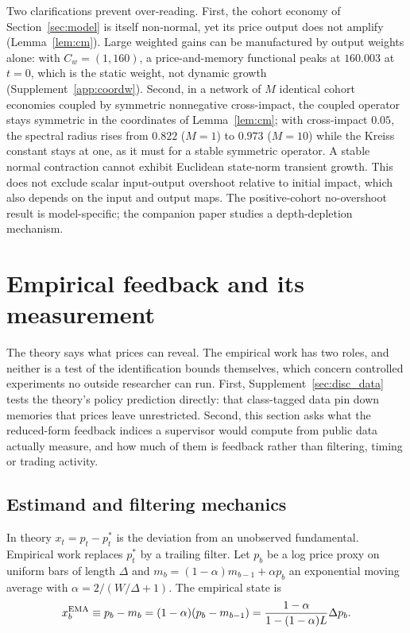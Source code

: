 \documentclass[12pt]{article}
\theoremstyle{definition}
\theoremstyle{remark}
\begin{document}
Two clarifications prevent over-reading. First, the cohort economy of Section~\ref{sec:model} is itself non-normal, yet its price output does not amplify (Lemma~\ref{lem:cm}). Large weighted gains can be manufactured by output weights alone: with $C_w=(1,160)$, a price-and-memory functional peaks at $160.003$ at $t=0$, which is the static weight, not dynamic growth (Supplement~\ref{app:coordw}). Second, in a network of $M$ identical cohort economies coupled by symmetric nonnegative cross-impact, the coupled operator stays symmetric in the coordinates of Lemma~\ref{lem:cm}; with cross-impact $0.05$, the spectral radius rises from $0.822$ ($M=1$) to $0.973$ ($M=10$) while the Kreiss constant stays at one, as it must for a stable symmetric operator. A stable normal contraction cannot exhibit Euclidean state-norm transient growth. This does not exclude scalar input-output overshoot relative to initial impact, which also depends on the input and output maps. The positive-cohort no-overshoot result is model-specific; the companion paper studies a depth-depletion mechanism.
\section{Empirical feedback and its measurement}\label{sec:empirics}

The theory says what prices can reveal. The empirical work has two roles, and neither is a test of the identification bounds themselves, which concern controlled experiments no outside researcher can run. First, Supplement~\ref{sec:disc_data} tests the theory's policy prediction directly: that class-tagged data pin down memories that prices leave unrestricted. Second, this section asks what the reduced-form feedback indices a supervisor would compute from public data actually measure, and how much of them is feedback rather than filtering, timing or trading activity.

\subsection{Estimand and filtering mechanics}

In theory $x_t=p_t-p^*_t$ is the deviation from an unobserved fundamental. Empirical work replaces $p^*_t$ by a trailing filter. Let $p_b$ be a log price proxy on uniform bars of length $\Delta$ and $m_b=(1-\alpha)m_{b-1}+\alpha p_b$ an exponential moving average with $\alpha=2/(W/\Delta+1)$. The empirical state is
\begin{equation}\label{eq:ema}
x^{\rm EMA}_b\equiv p_b-m_b=(1-\alpha)(p_b-m_{b-1})=\frac{1-\alpha}{1-(1-\alpha)L}\Delta p_b .
\end{equation}
\end{document}
